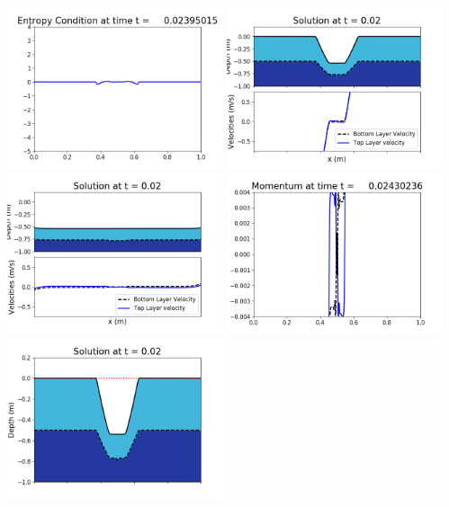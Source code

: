 \documentclass[11pt]{article}
\begin{document}
\vskip 10pt 
\includegraphics[width=0.475\textwidth]{frame0069fig1009.png}
\vskip 10pt 
\includegraphics[width=0.475\textwidth]{frame0070fig1001.png}
\includegraphics[width=0.475\textwidth]{frame0070fig1002.png}
\vskip 10pt 
\includegraphics[width=0.475\textwidth]{frame0070fig1003.png}
\includegraphics[width=0.475\textwidth]{frame0070fig1006.png}
\end{document}
